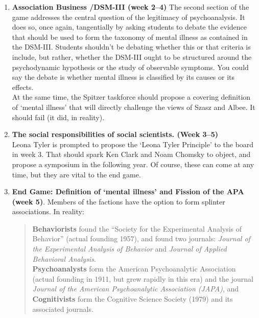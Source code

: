 \begin{refsection}
\begin{enumerate}
\item \textbf{Association Business \slash  DSM-III (week 2--4)}
The second section of the game addresses the central question of the legitimacy of psychoanalysis. It does so, once again, tangentially by asking students to debate the evidence that should be used to form the taxonomy of mental illness as contained in the DSM-III. Students shouldn’t be debating whether this or that criteria is include, but rather, whether the DSM-III ought to be structured around the psychodynamic hypothesis or the study of observable symptoms. You could say the debate is whether mental illness is classified by its causes or its effects.\\
At the same time, the Spitzer taskforce should propose a covering definition of `mental illness' that will directly challenge the views of Szasz and Albee. It should fail (it did, in reality). 

\item \textbf{The social responsibilities of social scientists. (Week 3--5)}\\
Leona Tyler is prompted to propose the `Leona Tyler Principle' to the board in week 3. That should spark Ken Clark and Noam Chomsky to object, and propose a symposium in the following year. Of course, these can come at any time, but they are vital to the end game. 

\item \textbf{End Game: Definition of ‘mental illness’ and Fission of the APA (week 5)}.
Members of the factions have the option to form splinter associations. In reality: 

\begin{quote}

\textbf{Behaviorists} found the “Society for the Experimental Analysis of Behavior” (actual founding 1957), and found two journals: \emph{Journal of the Experimental Analysis of Behavior} and \emph{Journal of Applied Behavioral Analysis}.\\
\textbf{Psychoanalysts} form the American Psychoanalytic Association (actual founding in 1911, but grew rapidly in this era) and the journal \emph{Journal of the American Psychoanalytic Association (JAPA)}, and\\
\textbf{Cognitivists} form the Cognitive Science Society (1979) and its associated journals. 
\end{quote}

\end{enumerate}


\end{refsection}
